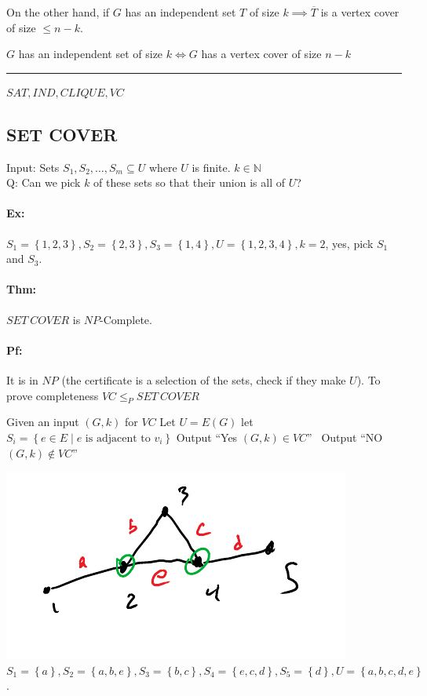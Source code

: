 \documentclass[12 pt]{article}
\begin{document}
          On the other hand, if $G$ has an independent set $T$
          of size $k\implies \overline{T}$ is a vertex cover of size
          $\leq n-k$.

          $G$ has an independent set of size $k \iff G$ has a vertex
          cover of size $n-k$
          \\ \noindent \rule{\textwidth}{0.5pt}
          $SAT, IND, CLIQUE, VC$
          \subsection{SET COVER}
          Input: Sets $S_1, S_2, \ldots, S_m \subseteq U$ where $U$ is
          finite. $k \in \mathbb{N}$
          \\ Q: Can we pick $k$ of these sets so that their union is
          all of $U$?
          \paragraph{Ex:} $S_1 = \left\{1,2,3\right\}, S_2 =
          \left\{2,3\right\}, S_3 = \left\{1,4\right\}, U=
          \left\{1,2,3,4\right\}, k = 2$, yes, pick $S_1$ and $S_3$.
          \paragraph{Thm:} $SET \ COVER$ is $NP$-Complete.
          \paragraph{Pf:} It is in $NP$ (the certificate is a
          selection of the sets, check if they make $U$). To prove
          completeness $VC \leq_P SET \ COVER$
          \begin{algorithmic}
            \State Given an input $(G,k)$ for $VC$
            \State Let $U = E(G)$
             let $S_i
            = \left\{e \in E \mid e \text{ is adjacent to }v_i\right\}$
             Output ``Yes $(G,k)\in VC$''
            \Else \ Output ``NO $(G,k)\notin VC$''
            \EndIf
            \EndIf
          \end{algorithmic}
          \includegraphics[width=.9\textwidth]{i132.pdf}\\
          $S_1 = \left\{a\right\}, S_2 = \left\{a,b,e\right\}, S_3 =
          \left\{b,c\right\}, S_4 = \left\{e,c,d\right\}, S_5 =
          \left\{d\right\}, U=\left\{a,b,c,d,e\right\}$.
\end{document}
